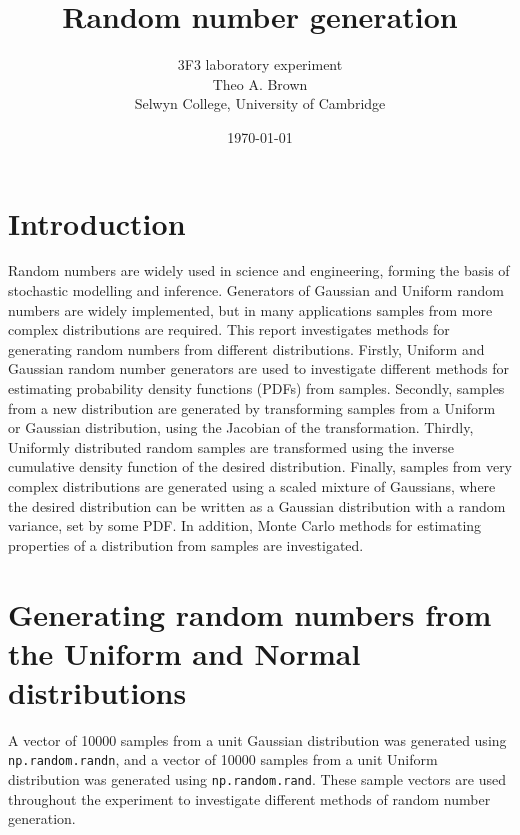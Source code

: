 \documentclass[a4paper]{article}
\begin{document}

\title{Random number generation}
\author{3F3 laboratory experiment \\ Theo A. Brown \\ Selwyn College, University of Cambridge}
\date{\today}
\maketitle

\tableofcontents


\section{Introduction}
Random numbers are widely used in science and engineering, forming the basis of stochastic modelling and
inference.
Generators of Gaussian and Uniform random numbers are widely implemented, but in many applications samples
from more complex distributions are required.
This report investigates methods for generating random numbers from different distributions.
Firstly, Uniform and Gaussian random number generators are used to investigate different methods for
estimating probability density functions (PDFs) from samples.
Secondly, samples from a new distribution are generated by transforming samples from a Uniform or
Gaussian distribution, using the Jacobian of the transformation.
Thirdly, Uniformly distributed random samples are transformed using the inverse cumulative density function
of the desired distribution.
Finally, samples from very complex distributions are generated using a scaled mixture of Gaussians, where
the desired distribution can be written as a Gaussian distribution with a random variance, set by some PDF.
In addition, Monte Carlo methods for estimating properties of a distribution from samples are investigated.


\section{Generating random numbers from the Uniform and Normal distributions}
\label{sec:uniform_normal}

A vector of 10000 samples from a unit Gaussian distribution was generated using \verb`np.random.randn`, and a vector of
10000 samples from a unit Uniform distribution was generated using \verb`np.random.rand`.
These sample vectors are used throughout the experiment to investigate different methods of random number generation.
\end{document}
